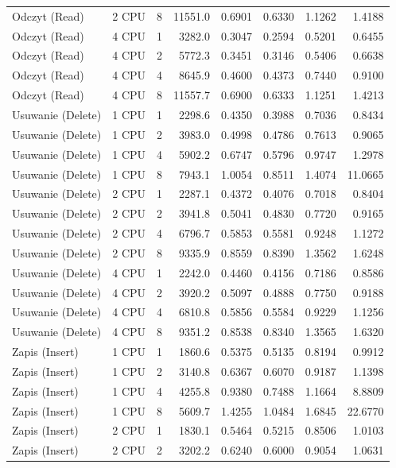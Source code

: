 \begin{table}[ht]
{\begin{tabular}{llcrrrrr}
Odczyt (Read) & 2 CPU & 8 & 11551.0 & 0.6901 & 0.6330 & 1.1262 & 1.4188 \\
Odczyt (Read) & 4 CPU & 1 & 3282.0 & 0.3047 & 0.2594 & 0.5201 & 0.6455 \\
Odczyt (Read) & 4 CPU & 2 & 5772.3 & 0.3451 & 0.3146 & 0.5406 & 0.6638 \\
Odczyt (Read) & 4 CPU & 4 & 8645.9 & 0.4600 & 0.4373 & 0.7440 & 0.9100 \\
Odczyt (Read) & 4 CPU & 8 & 11557.7 & 0.6900 & 0.6333 & 1.1251 & 1.4213 \\
Usuwanie (Delete) & 1 CPU & 1 & 2298.6 & 0.4350 & 0.3988 & 0.7036 & 0.8434 \\
Usuwanie (Delete) & 1 CPU & 2 & 3983.0 & 0.4998 & 0.4786 & 0.7613 & 0.9065 \\
Usuwanie (Delete) & 1 CPU & 4 & 5902.2 & 0.6747 & 0.5796 & 0.9747 & 1.2978 \\
Usuwanie (Delete) & 1 CPU & 8 & 7943.1 & 1.0054 & 0.8511 & 1.4074 & 11.0665 \\
Usuwanie (Delete) & 2 CPU & 1 & 2287.1 & 0.4372 & 0.4076 & 0.7018 & 0.8404 \\
Usuwanie (Delete) & 2 CPU & 2 & 3941.8 & 0.5041 & 0.4830 & 0.7720 & 0.9165 \\
Usuwanie (Delete) & 2 CPU & 4 & 6796.7 & 0.5853 & 0.5581 & 0.9248 & 1.1272 \\
Usuwanie (Delete) & 2 CPU & 8 & 9335.9 & 0.8559 & 0.8390 & 1.3562 & 1.6248 \\
Usuwanie (Delete) & 4 CPU & 1 & 2242.0 & 0.4460 & 0.4156 & 0.7186 & 0.8586 \\
Usuwanie (Delete) & 4 CPU & 2 & 3920.2 & 0.5097 & 0.4888 & 0.7750 & 0.9188 \\
Usuwanie (Delete) & 4 CPU & 4 & 6810.8 & 0.5856 & 0.5584 & 0.9229 & 1.1256 \\
Usuwanie (Delete) & 4 CPU & 8 & 9351.2 & 0.8538 & 0.8340 & 1.3565 & 1.6320 \\
Zapis (Insert) & 1 CPU & 1 & 1860.6 & 0.5375 & 0.5135 & 0.8194 & 0.9912 \\
Zapis (Insert) & 1 CPU & 2 & 3140.8 & 0.6367 & 0.6070 & 0.9187 & 1.1398 \\
Zapis (Insert) & 1 CPU & 4 & 4255.8 & 0.9380 & 0.7488 & 1.1664 & 8.8809 \\
Zapis (Insert) & 1 CPU & 8 & 5609.7 & 1.4255 & 1.0484 & 1.6845 & 22.6770 \\
Zapis (Insert) & 2 CPU & 1 & 1830.1 & 0.5464 & 0.5215 & 0.8506 & 1.0103 \\
Zapis (Insert) & 2 CPU & 2 & 3202.2 & 0.6240 & 0.6000 & 0.9054 & 1.0631 \\

\end{tabular}}
\end{table}
